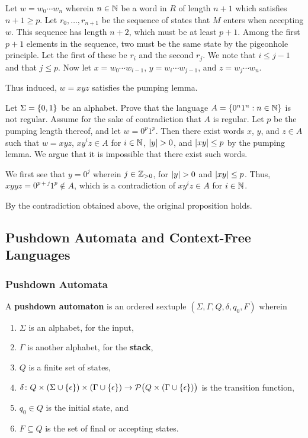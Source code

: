    Let \(w = w_0 \cdots w_n\) wherein \(n \in \mathbb{N}\) be a word in \(R\) of
    length \(n + 1\) which satisfies \(n + 1 \geq p\). Let \(r_0, \ldots, r_{n +
    1}\) be the sequence of states that \(M\) enters when accepting \(w\). This
    sequence has length \(n + 2\), which must be at least \(p + 1\). Among the
    first \(p + 1\) elements in the sequence, two must be the same state by the
    pigeonhole principle. Let the first of these be \(r_i\) and the second
    \(r_j\). We note that \(i \leq j - 1\) and that \(j \leq p\). Now let \(x =
    w_0 \cdots w_{i - 1}\), \(y = w_i \cdots w_{j - 1}\), and \(z = w_j \cdots
    w_n\).

    Thus induced, \(w = x y z\) satisfies the pumping lemma.
\Epr

\Bxr
    Let \(\Sigma = \{0, 1\}\) be an alphabet. Prove that the language
    \(A = \{0^n 1^n : n \in \mathbb{N}\}\) is not regular.
\Exr
\Bsl
    Assume for the sake of contradiction that \(A\) is regular. Let \(p\) be the
    pumping length thereof, and let \(w = 0^p 1^p\). Then there exist words
    \(x\), \(y\), and \(z\in A\) such that \(w = x y z\), \(x y^i z \in A\) for
    \(i \in \mathbb{N}\), \(\lvert y\rvert > 0\), and \(\lvert x y\rvert \leq p\) by the pumping
    lemma. We argue that it is impossible that there exist such words.

    We first see that \(y = 0^j\) wherein \(j \in \mathbb{Z}_{>0}\), for \(\lvert y\rvert > 0\)
    and \(\lvert x y\rvert \leq p\). Thus, \(x y y z = 0^{p + j} 1^p \not\in A\), which
    is a contradiction of \(x y^i z \in A\) for \(i \in \mathbb{N}\).

    By the contradiction obtained above, the original proposition holds.
\Esl

\subsection{Pushdown Automata and Context-Free Languages}

\subsubsection{Pushdown Automata}

\Bdf
    A {\bf pushdown automaton} is an ordered sextuple \((\Sigma, \Gamma, Q,
    \delta, q_0, F)\) wherein
    \begin{enumerate}
        \item \(\Sigma\) is an alphabet, for the input,
        \item \(\Gamma\) is another alphabet, for the {\bf stack},
        \item \(Q\) is a finite set of states,
        \item \(\delta\colon Q \times (\Sigma \cup \{\epsilon\}) \times
        (\Gamma \cup \{\epsilon\})\to\mathcal{P}\big(Q \times (\Gamma \cup
        \{\epsilon\})\big)\) is the transition function,
        \item \(q_0 \in Q\) is the initial state, and
        \item \(F \subseteq Q\) is the set of final or accepting states.
    \end{enumerate}
\Edf

